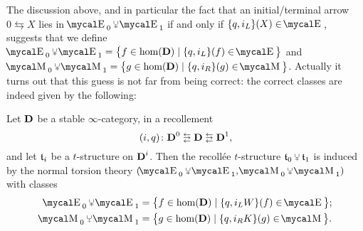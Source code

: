 The discussion above, and in particular the fact that an initial\fshyp{}terminal arrow $0\leftrightarrows X$ lies in $\EE_0\glue\EE_1$ if and only if $\{q, i_L\}(X)\in \EE$, suggests that we define 
$\EE_0\glue\EE_1 = \big\{f\in\hom(\D)\mid 
\{q, i_L\}(f)\in \EE 
\big\}$ and $\MM_0\glue\MM_1 = \big\{g\in\hom(\D)\mid 
\{q, i_R\}(g) \in \MM
\big\}$. Actually it turns out that this guess is not far from being correct: the correct classes are indeed given by the following: 
\begin{theorem}
\label{thm:trueglued}
Let $\textbf{D}$ be a stable $\infty$\hyp{}category, in a recollement 
$$
(i,q)\colon \D^0 \lrlarrows  \D  \lrlarrows  \D^1,
$$
and let $\mathfrak{t}_i$ be a $t$\hyp{}structure on $\textbf{D}^i$. Then the recoll\'ee $t$\hyp{}structure $\tee_0\glue \tee_1$ is induced by the normal torsion theory $(\EE_0\glue\EE_1,\MM_0\glue\MM_1)$ with classes
\begin{align}
\EE_0\glue\EE_1 &= \big\{f\in\hom(\D)\mid 
\{q, i_LW\}(f)\in \EE 
\big\};\label{BBDleftclass}\\
\MM_0\glue\MM_1 &= \big\{g\in\hom(\D)\mid 
\{q, i_RK\}(g) \in \MM
\big\}.
\end{align}
\end{theorem}
